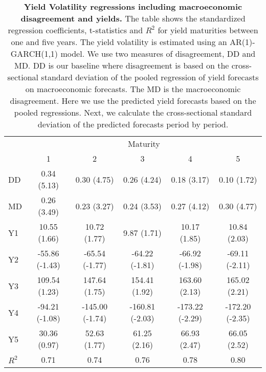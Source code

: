 \begin{table}[H]
\centering
\caption{\textbf{Yield Volatility regressions including macroeconomic disagreement and yields.} The table shows the standardized regression coefficients, t-statistics and $R^2$ for yield maturities between one and five years. The yield volatility is estimated using an AR(1)-GARCH(1,1) model. We use two measures of disagreement, DD and MD. DD is our baseline where disagreement is based on the cross-sectional standard deviation of the pooled regression of yield forecasts on macroeconomic forecasts. The MD is the macroeconomic disagreement. Here we use the predicted yield forecasts based on the pooled regressions. Next, we calculate the cross-sectional standard deviation of the predicted forecasts period by period.}
\begin{tabular}{lccccc}
\hline
\hline
& \multicolumn{5}{c}{Maturity} \\
 & 1 &  2 & 3 &  4 & 5 \\
\hline
DD  & 0.34 (5.13) & 0.30 (4.75) & 0.26 (4.24) & 0.18 (3.17) & 0.10 (1.72) \\
MD & 0.26 (3.49) & 0.23 (3.27) & 0.24 (3.53) & 0.27 (4.12) & 0.30 (4.77) \\
Y1 & 10.55 (1.66) & 10.72 (1.77) & 9.87 (1.71) & 10.17 (1.85) & 10.84 (2.03) \\
Y2 & -55.86 (-1.43) & -65.54 (-1.77) & -64.22 (-1.81) & -66.92 (-1.98) & -69.11 (-2.11) \\
Y3 & 109.54 (1.23) & 147.64 (1.75) & 154.41 (1.92) & 163.60 (2.13) & 165.02 (2.21) \\
Y4 & -94.21 (-1.08) & -145.00 (-1.74) & -160.81 (-2.03) & -173.22 (-2.29) & -172.20 (-2.35) \\
Y5 & 30.36 (0.97) & 52.63 (1.77) & 61.25 (2.16) & 66.93 (2.47) & 66.05 (2.52) \\
$R^2$ & 0.71 & 0.74 & 0.76 & 0.78 & 0.80 \\
\hline
\end{tabular}
\label{table:Vola2Dis_YieldsMD}
\end{table}


